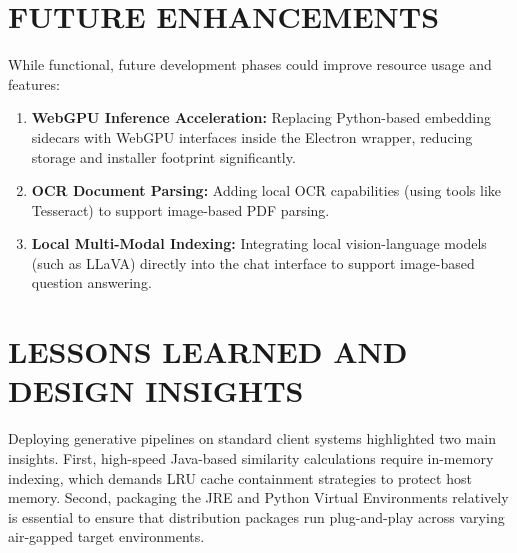 \documentclass[12pt,a4paper]{report}
\begin{document}
\section{FUTURE ENHANCEMENTS}
While functional, future development phases could improve resource usage and features:
\begin{enumerate}
    \item \textbf{WebGPU Inference Acceleration:} Replacing Python-based embedding sidecars with WebGPU interfaces inside the Electron wrapper, reducing storage and installer footprint significantly.
    \item \textbf{OCR Document Parsing:} Adding local OCR capabilities (using tools like Tesseract) to support image-based PDF parsing.
    \item \textbf{Local Multi-Modal Indexing:} Integrating local vision-language models (such as LLaVA) directly into the chat interface to support image-based question answering.
\end{enumerate}

\section{LESSONS LEARNED AND DESIGN INSIGHTS}
Deploying generative pipelines on standard client systems highlighted two main insights. First, high-speed Java-based similarity calculations require in-memory indexing, which demands LRU cache containment strategies to protect host memory. Second, packaging the JRE and Python Virtual Environments relatively is essential to ensure that distribution packages run plug-and-play across varying air-gapped target environments.
\end{document}
